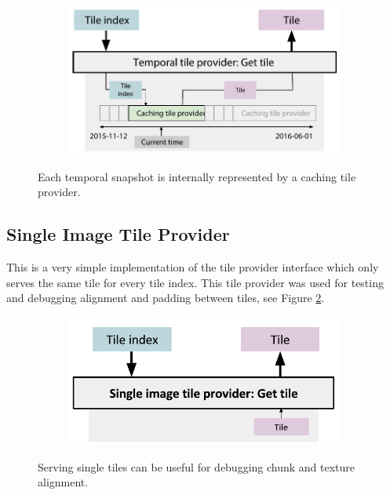 \begin{figure}[htbp]
    \centering
    \begin{subfigure}[bt]{0.7\textwidth}
        \includegraphics[width=\textwidth]{figures/implementation/tileprovider/temporaltileprovider_gettile.pdf}
    \end{subfigure}
    \caption{Each temporal snapshot is internally represented by a caching tile provider.}
    \label{fig:temporaltileprovider_gettile}
\end{figure}


\subsection{Single Image Tile Provider}
This is a very simple implementation of the tile provider interface which only serves the same tile for every tile index. This tile provider was used for testing and debugging alignment and padding between tiles, see Figure \ref{fig:singleimagetileprovider_gettile}.

\begin{figure}[htbp]
    \centering
    \begin{subfigure}[bt]{0.5\textwidth}
        \includegraphics[width=\textwidth]{figures/implementation/tileprovider/singleimagetileprovider_gettile.pdf}
    \end{subfigure}
    \caption{Serving single tiles can be useful for debugging chunk and texture alignment.}
    \label{fig:singleimagetileprovider_gettile}
\end{figure}

